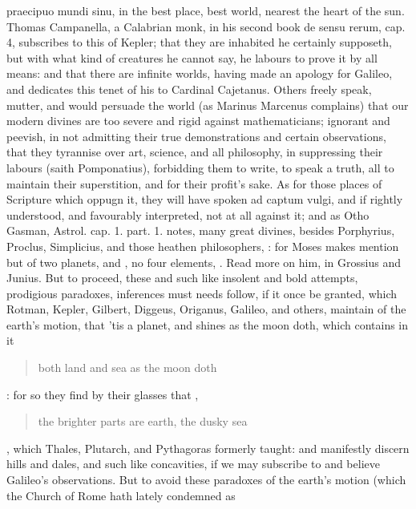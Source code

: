 {praecipuo mundi sinu, in the best place, best world, nearest the heart
of the sun. Thomas Campanella, a Calabrian monk, in his second
book de sensu rerum, cap. 4, subscribes to this of Kepler; that they
are inhabited he certainly supposeth, but with what kind of creatures
he cannot say, he labours to prove it by all means: and that there are
infinite worlds, having made an apology for Galileo, and dedicates this
tenet of his to Cardinal Cajetanus. Others freely speak, mutter, and
would persuade the world (as Marinus Marcenus complains) that our
modern divines are too severe and rigid against mathematicians;
ignorant and peevish, in not admitting their true demonstrations and
certain observations, that they tyrannise over art, science, and all
philosophy, in suppressing their labours (saith Pomponatius),
forbidding them to write, to speak a truth, all to maintain their
superstition, and for their profit's sake. As for those places of
Scripture which oppugn it, they will have spoken ad captum vulgi, and
if rightly understood, and favourably interpreted, not at all against
it; and as Otho Gasman, Astrol. cap. 1. part. 1. notes, many great
divines, besides Porphyrius, Proclus, Simplicius, and those heathen
philosophers, : for Moses makes mention but of two planets, 
and , no four elements, \etc{}. Read more on him, in Grossius and
Junius. But to proceed, these and such like insolent and bold attempts,
prodigious paradoxes, inferences must needs follow, if it once be
granted, which Rotman, Kepler, Gilbert, Diggeus, Origanus, Galileo, and
others, maintain of the earth's motion, that 'tis a planet, and shines
as the moon doth, which contains in it \blockquote{both land and sea as the
moon doth}: for so they find by their glasses that , \blockquote{the brighter parts are earth, the dusky sea}, which Thales,
Plutarch, and Pythagoras formerly taught: and manifestly discern hills
and dales, and such like concavities, if we may subscribe to and
believe Galileo's observations. But to avoid these paradoxes of the
earth's motion (which the Church of Rome hath lately condemned as
}
